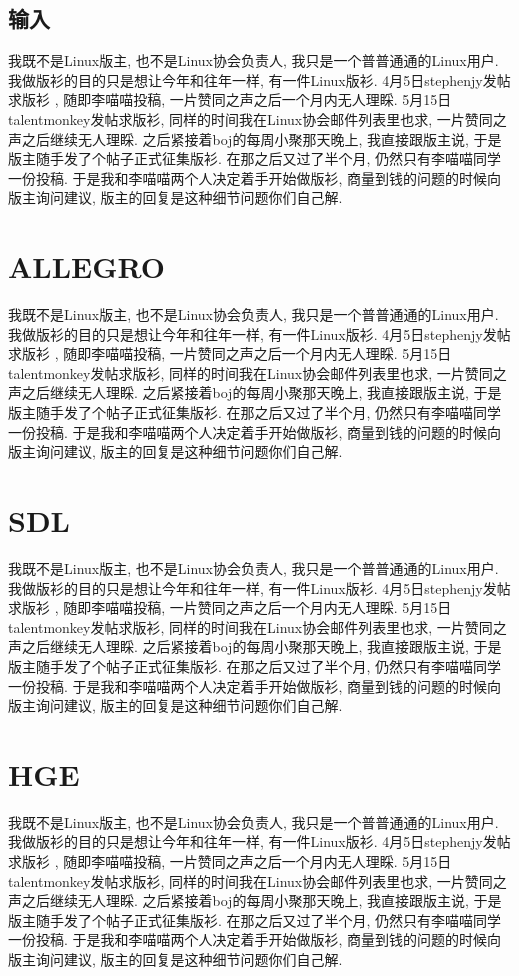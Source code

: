 \subsection{输入}
我既不是Linux版主, 也不是Linux协会负责人, 我只是一个普普通通的Linux用户. 我做版衫的目的只是想让今年和往年一样, 有一件Linux版衫. 4月5日stephenjy发帖求版衫 , 随即李喵喵投稿, 一片赞同之声之后一个月内无人理睬. 5月15日talentmonkey发帖求版衫, 同样的时间我在Linux协会邮件列表里也求, 一片赞同之声之后继续无人理睬. 之后紧接着boj的每周小聚那天晚上, 我直接跟版主说, 于是版主随手发了个帖子正式征集版衫. 在那之后又过了半个月, 仍然只有李喵喵同学一份投稿. 于是我和李喵喵两个人决定着手开始做版衫, 商量到钱的问题的时候向版主询问建议, 版主的回复是这种细节问题你们自己解.

\section{ALLEGRO}
我既不是Linux版主, 也不是Linux协会负责人, 我只是一个普普通通的Linux用户. 我做版衫的目的只是想让今年和往年一样, 有一件Linux版衫. 4月5日stephenjy发帖求版衫 , 随即李喵喵投稿, 一片赞同之声之后一个月内无人理睬. 5月15日talentmonkey发帖求版衫, 同样的时间我在Linux协会邮件列表里也求, 一片赞同之声之后继续无人理睬. 之后紧接着boj的每周小聚那天晚上, 我直接跟版主说, 于是版主随手发了个帖子正式征集版衫. 在那之后又过了半个月, 仍然只有李喵喵同学一份投稿. 于是我和李喵喵两个人决定着手开始做版衫, 商量到钱的问题的时候向版主询问建议, 版主的回复是这种细节问题你们自己解.
\section{SDL}
我既不是Linux版主, 也不是Linux协会负责人, 我只是一个普普通通的Linux用户. 我做版衫的目的只是想让今年和往年一样, 有一件Linux版衫. 4月5日stephenjy发帖求版衫 , 随即李喵喵投稿, 一片赞同之声之后一个月内无人理睬. 5月15日talentmonkey发帖求版衫, 同样的时间我在Linux协会邮件列表里也求, 一片赞同之声之后继续无人理睬. 之后紧接着boj的每周小聚那天晚上, 我直接跟版主说, 于是版主随手发了个帖子正式征集版衫. 在那之后又过了半个月, 仍然只有李喵喵同学一份投稿. 于是我和李喵喵两个人决定着手开始做版衫, 商量到钱的问题的时候向版主询问建议, 版主的回复是这种细节问题你们自己解.
\section{HGE}
我既不是Linux版主, 也不是Linux协会负责人, 我只是一个普普通通的Linux用户. 我做版衫的目的只是想让今年和往年一样, 有一件Linux版衫. 4月5日stephenjy发帖求版衫 , 随即李喵喵投稿, 一片赞同之声之后一个月内无人理睬. 5月15日talentmonkey发帖求版衫, 同样的时间我在Linux协会邮件列表里也求, 一片赞同之声之后继续无人理睬. 之后紧接着boj的每周小聚那天晚上, 我直接跟版主说, 于是版主随手发了个帖子正式征集版衫. 在那之后又过了半个月, 仍然只有李喵喵同学一份投稿. 于是我和李喵喵两个人决定着手开始做版衫, 商量到钱的问题的时候向版主询问建议, 版主的回复是这种细节问题你们自己解.
